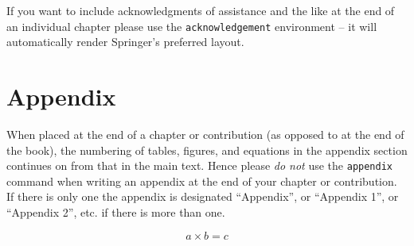 \documentclass[graybox]{svmult}
\begin{document}
%
\begin{acknowledgement}
If you want to include acknowledgments of assistance and the like at the end of an individual chapter please use the \verb|acknowledgement| environment -- it will automatically render Springer's preferred layout.
\end{acknowledgement}
%
\section*{Appendix}
%
%
When placed at the end of a chapter or contribution (as opposed to at the end of the book), the numbering of tables, figures, and equations in the appendix section continues on from that in the main text. Hence please \textit{do not} use the \verb|appendix| command when writing an appendix at the end of your chapter or contribution. If there is only one the appendix is designated ``Appendix'', or ``Appendix 1'', or ``Appendix 2'', etc. if there is more than one.

\begin{equation}
a \times b = c
\end{equation}





\end{document}
